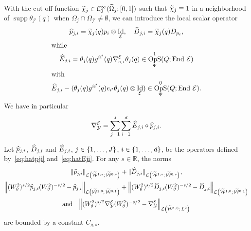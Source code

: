\documentclass[AHL,Unicode,longabstracts]{cedram}
\newcommand{\R}{\mathbb{R}}
\newcommand{\clW}{\mathcal{W}}
\newcommand{\clC}{\mathcal{C}}
\newcommand{\clY}{\mathcal{Y}}
\newcommand{\clE}{\mathcal{E}}
\newcommand{\clL}{\mathcal{L}}
\DeclareMathOperator{\End}{End}
\DeclareMathOperator{\OpS}{OpS}
\DeclareMathOperator{\suppp}{supp}
\DeclareMathOperator{\Idd}{Id}
\let\oldtilde\tilde
\renewcommand*{\tilde}[1]{\mathchoice{\widetilde{#1}}{\widetilde{#1}}{\oldtilde{#1}}{\oldtilde{#1}}}
\let\oldhat\hat
\renewcommand*{\hat}[1]{\mathchoice{\widehat{#1}}{\widehat{#1}}{\oldhat{#1}}{\oldhat{#1}}}
\let\originalleft\left
\let\originalright\right
\renewcommand{\left}{\mathopen{}\mathclose\bgroup\originalleft}
\renewcommand{\right}{\aftergroup\egroup\originalright}
\begin{document}
With the cut-off function $\tilde{\chi}_{j}\in \clC^{\infty}_{0}(\tilde{\Omega}_{j};[0,1])$ such that $\tilde{\chi}_{j}\equiv 1$ in a neighborhood of $\suppp\theta_{j'}(q)$ when $\Omega_{j}\cap \Omega_{j'}\neq \emptyset$, we can introduce the local scalar operator
\begin{gather}
\hat{p}_{j,i}=\tilde{\chi}_{j}(q)p_{i}\otimes \Idd_{\clE},\quad \hat{D}_{j,i}=\tilde{\chi}_{j}(q)D_{p_{i}},\label{eq:hatpji}
\\
\intertext{while} \hat{E}_{j,i}=\theta_{j}(q)g^{ii'}(q)\nabla_{e_{i'}}^{\clE}\theta_{j}(q)\in \OpS^{1}_{\Psi}(Q;\End\,\clE)\label{eq:hatEji}\\
\intertext{with}
\hat{E}_{j,i}-(\theta_{j}(q)g^{ii'}(q)e_{i'}\theta_{j}(q)\otimes \Idd_{\clE})\in \OpS^{0}_{\Psi}(Q;\End\,\clE).\label{eq:hatEji12}
\end{gather}
We have in particular
\[
\nabla^{\clE}_{\clY}=\sum_{j=1}^{J}\sum_{i=1}^{d}\hat{E}_{j,i}\circ \hat{p}_{j,i}.
\]
\begin{prop}\label{pr:nablaY}
Let $\hat{p}_{j,i}$, $\hat{D}_{j,i}$ and $\hat{E}_{j,i}$, $j\in \left\{1,\dots,J\right\}$, $i\in \left\{1,\dots,d\right\}$, be the operators defined by~\eqref{eq:hatpji} and~\eqref{eq:hatEji}. For any $s\in \R$, the norms
\begin{multline*}
\|\hat{p}_{j,i}\|_{\clL\left(\widetilde{\clW}^{1,s};\,\widetilde{\clW}^{0,s}\right)}+\|\hat{D}_{j,i}\|_{\clL\left(\widetilde{\clW}^{1,s};\,\widetilde{\clW}^{0,s}\right)},
\\
\left\|(W^{2}_{\theta})^{s/2}\hat{p}_{j,i}(W^{2}_{\theta})^{-s/2}-\hat{p}_{j,i}\right\|_{\clL\left(\widetilde{\clW}^{1,0};\,\widetilde{\clW}^{0,1}\right)}+\left\|(W^{2}_{\theta})^{s/2}\hat{D}_{j,i}(W^{2}_{\theta})^{-s/2}-\hat{D}_{j,i}\right\|_{\clL\left(\widetilde{\clW}^{1,0};\,\widetilde{\clW}^{0,1}\right)}
\\
\text{and}\quad
\left\|(W^{2}_{\theta})^{s/2}\nabla_{\clY}^{\clE}(W^{2}_{\theta})^{-s/2}-\nabla_{\clY}^{\clE}\right\|_{\clL\left(\widetilde{\clW}^{1,0};\,L^{2}\right)}
\end{multline*}
are bounded by a constant $C_{g,s}$.
\end{prop}
\end{document}
